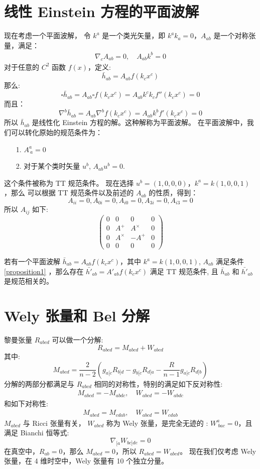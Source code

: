 \documentclass[lang=cn,a4paper,newtx]{elegantpaper}
\begin{document}
\section{线性 Einstein 方程的平面波解}
现在考虑一个平面波解，
令 $k^a$ 是一个类光矢量，即 $k^ak_a = 0$，$A_{ab}$ 是一个对称张量，满足：
\begin{align}
\label{proposition1}
\nabla_cA_{ab} = 0, \quad A_{ab}k^b = 0
\end{align}
对于任意的 $C^2$ 函数 $f(x)$，定义:
$$
\bar{h}_{ab} = A_{ab}f(k_cx^c)
$$
那么:
$$
\square \bar{h}_{ab} = A_{ab}\square f(k_cx^c) = A_{ab}k^ck_c f''(k_cx^c) = 0
$$
而且：
$$
\nabla^b\bar{h}_{ab} = A_{ab}\nabla^bf(k_cx^c) = A_{ab}k^bf'(k_cx^c) = 0
$$
所以 $\bar{h}_{ab}$ 是线性化 Einstein 方程的解。这种解称为平面波解。
在平面波解中，我们可以转化原始的规范条件为：
\begin{itemize}
    \item[1.] $A^a_{\ a} = 0$
    \item[2.] 对于某个类时矢量 $u^b$, $A_{ab}u^b = 0$.
\end{itemize}
这个条件被称为 TT 规范条件。
现在选择 $u^b = (1, 0, 0, 0)$，$k^a = k(1, 0, 0, 1)$，那么 
可以根据 TT 规范条件以及前述的 $A_{ab}$ 的性质，得到：
$$
A_{ii} = 0, A_{0i} = 0, A_{i0} = 0, A_{3i} = 0, A_{i3} = 0
$$
所以 $A_{ij}$ 如下:
$$
\begin{pmatrix}
0 & 0 & 0 & 0\\
0 & A^{+} & A^{\times} & 0\\
0 & A^{\times} & -A^{+} & 0\\
0 & 0 & 0 & 0
\end{pmatrix}
$$

\begin{proposition}
    若有一个平面波解 $\bar{h}_{ab} = A_{ab}f(k_cx^c)$，其中 $k^a = k(1, 0, 0,
    1)$, $A_{ab}$ 满足条件
    \eqref{proposition1} ，那么存在 $\bar{h'}_{ab} = A'_{ab}f(k_cx^c)$ 满足 TT
    规范条件, 且 $\bar{h}_{ab}$ 和 $\bar{h'}_{ab}$ 是规范相关的。
\end{proposition}

\section{Wely 张量和 Bel 分解}
黎曼张量 $R_{abcd}$ 可以做一个分解:
$$
R_{abcd} = M_{abcd} + W_{abcd}
$$
其中:
$$
M_{abcd} = \frac{2}{n-2}(g_{a[c}R_{b]d} - g_{b[c}R_{d]a} -
\frac{R}{n-1}g_{a[c}R_{d]b})
$$
分解的两部分都满足与 $R_{abcd}$ 相同的对称性，特别的满足如下反对称性:
\begin{align}
\label{asymmetry}
M_{abcd} = -M_{abdc}, \quad W_{abcd} = -W_{abdc}
\end{align}
和如下对称性:
\begin{align}
\label{symmetry}
M_{abcd} = M_{cdab}, \quad W_{abcd} = W_{cdab}
\end{align}
$M_{abcd}$ 与 Ricci 张量有关，
$W_{abcd}$ 称为 Wely 张量，是完全无迹的 : $W^a_{\ bac} = 0$，且满足 Bianchi 恒等式:
$$
\nabla_{[a}W_{bc]de} = 0
$$
在真空中，$R_{ab} = 0$，那么 $M_{abcd} = 0$，所以 $R_{abcd} = W_{abcd}$。
现在我们仅考虑 Wely 张量，在 4 维时空中，Wely 张量有 10 个独立分量。
\end{document}
